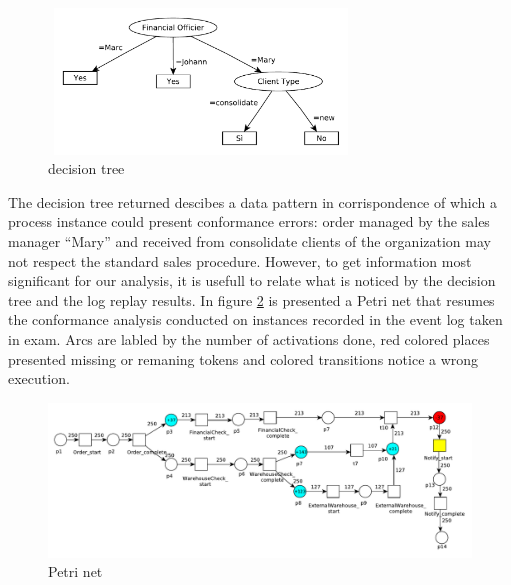 \documentclass[11pt]{article}
\begin{document}
\begin{figure}[h]\label{salesDecTree}
\centering
\includegraphics[width=230pt,height=110pt]
{./items/Sales_tree.pdf}
\caption{decision tree}
\end{figure}
The decision tree returned descibes a data pattern in corrispondence of which a process instance could present conformance errors: order managed by the sales manager ``Mary'' and received from consolidate clients of the organization may not respect the standard sales procedure. However, to get information most significant for our analysis, it is usefull to relate what is noticed by the decision tree and the log replay results. In figure \ref{replayResult} is presented a Petri net that resumes the conformance analysis conducted on instances recorded in the event log taken in exam. Arcs are labled by the number of activations done, red colored places presented missing or remaning tokens and colored transitions notice a wrong execution.\\
\begin{figure}[h]\label{replayResult}
\includegraphics[width=390pt]
{./items/Sales_PN_result.pdf}
\caption{Petri net}
\end{figure}
\end{document}
